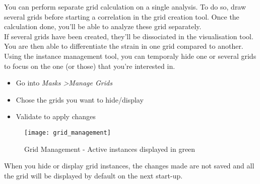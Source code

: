 \indent\indent You can perform separate grid calculation on a single analysis. To do so, draw several grids before starting a correlation in the grid creation tool. Once the calculation done, you'll be able to analyze these grid separately.\\
\newline
\indent If several grids have been created, they'll be dissociated in the visualisation tool. You are then able to differentiate the strain in one grid compared to another. Using the instance management tool, you can temporaly hide one or several grids to focus on the one (or those) that you're interested in.
\begin{itemize}
  \item Go into \textit{Masks \textgreater Manage Grids}
  \item Chose the grids you want to hide/display
  \item Validate to apply changes
\end{itemize}
\newline

\begin{figure}[!h]
   \centering
   \texttt{[image: grid\_management]}
   \caption{Grid Management - Active instances displayed in green}
\end{figure}

When you hide or display grid instances, the changes made are not saved and all the grid will be displayed by default on the next start-up.
